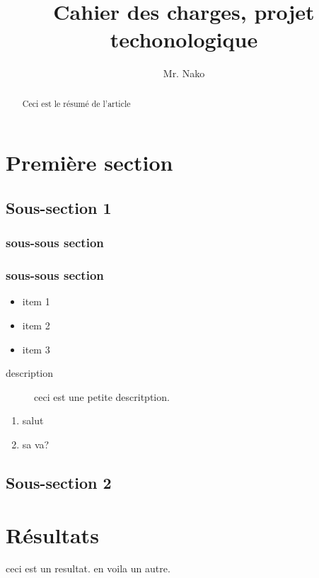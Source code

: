 \documentclass{article}
\title{Cahier des charges, projet techonologique}
\author{Mr. Nako}
\begin{document}
\maketitle

\tableofcontents

\begin{abstract}
Ceci est le résumé de l'article
\end{abstract}

\section{Première section}
\subsection{Sous-section 1}

\subsubsection{sous-sous section}

\subsubsection{sous-sous section}

\begin{itemize}
\item item 1
\item item 2
\item item 3
\end{itemize}

\begin{description}
\item[description] ceci est une petite descritption.
\end{description}

\begin{enumerate}
\item salut
\item sa va?
\end{enumerate}

\subsection{Sous-section 2}
\section{Résultats}
\label{resultats}
  ceci est un resultat.
  en voila un autre.
\end{document}
